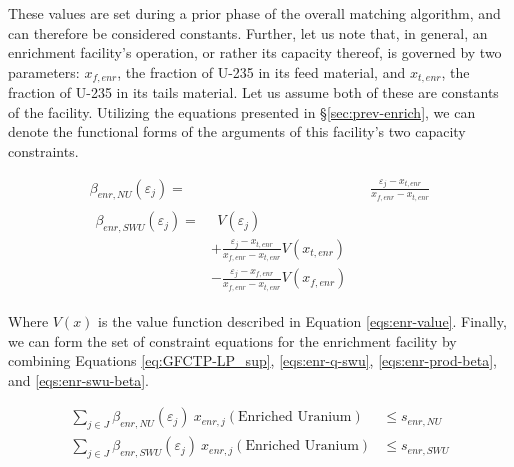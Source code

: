 These values are set during a prior phase of the overall matching algorithm, and
can therefore be considered constants. Further, let us note that, in general, an
enrichment facility's operation, or rather its capacity thereof, is governed by
two parameters: $x_{f,enr}$, the fraction of U-235 in its feed material, and
$x_{t,enr}$, the fraction of U-235 in its tails material. Let us assume both of
these are constants of the facility. Utilizing the equations presented in
\S\ref{sec:prev-enrich}, we can denote the functional forms of the arguments of 
this facility's two capacity constraints.

\begin{align}
\label{eqs:enr-prod-beta}
\beta_{enr,NU}(\varepsilon_{j}) = & \:\: \frac{\varepsilon_{j} - x_{t,enr}}
                                      {x_{f,enr} - x_{t,enr}} \\
\begin{split}
\label{eqs:enr-swu-beta}
\beta_{enr,SWU}(\varepsilon_{j}) = & \:\: V(\varepsilon_{j}) \\
                         & + \frac{\varepsilon_{j} - x_{t,enr}}
                                  {x_{f,enr} - x_{t,enr}} V(x_{t,enr}) \\
                         & - \frac{\varepsilon_{j} - x_{f,enr}}
                                  {x_{f,enr} - x_{t,enr}} V(x_{f,enr})
\end{split}
\end{align}

Where $V(x)$ is the value function described in Equation \ref{eqs:enr-value}.
Finally, we can form the set of constraint equations for the enrichment
facility by combining Equations \ref{eq:GFCTP-LP_sup}, \ref{eqs:enr-q-swu}, 
\ref{eqs:enr-prod-beta}, and \ref{eqs:enr-swu-beta}.

\begin{align}
\label{eqs:enr-prod-constr}
\sum_{j \in J}\beta_{enr,NU}(\varepsilon_{j}) \: x_{enr,j}(\mbox{Enriched Uranium})  & \leq s_{enr,NU} \\
\label{eqs:enr-swu-constr}
\sum_{j \in J}\beta_{enr,SWU}(\varepsilon_{j}) \: x_{enr,j}(\mbox{Enriched Uranium}) & \leq s_{enr,SWU}
\end{align}

